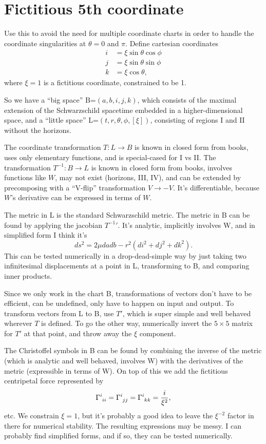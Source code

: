 \documentclass{article}
\begin{document}
\section{Fictitious 5th coordinate}
Use this to avoid the need for multiple coordinate charts in order to handle the coordinate singularities
at $\theta=0$ and $\pi$. Define cartesian coordinates
\begin{align*}
  i &= \xi \sin\theta \cos\phi \\
  j &= \xi \sin\theta \sin\phi \\
  k &= \xi \cos\theta ,
\end{align*}
where $\xi=1$ is a fictitious coordinate, constrained to be 1.

So we have a ``big space'' B=$(a,b,i,j,k)$, which consists of the maximal extension of the Schwarzschild
spacetime embedded in a higher-dimensional space, and a ``little space'' L=$(t,r,\theta,\phi,[\xi])$,
consisting of regions I and II without the horizons.

The coordinate transformation $T:L\to B$ is known in closed form from
books, uses only elementary functions, and is special-cased for I vs
II. The transformation $T^{-1}:B\to L$ is known in closed form from
books, involves functions like $W$, may not exist (horizons, III, IV),
and can be extended by precomposing with a ``V-flip'' transformation
$V\rightarrow -V$. It's differentiable, because $W$'s derivative can
be expressed in terms of $W$. 

The metric in L is the standard Schwarzschild metric.
The metric in B can be found by applying the jacobian ${T^{-1}}'$. It's analytic, implicitly involves W,
and in simplified form I think it's
\begin{equation*}
  ds^2 = 2\mu dadb -r^2(di^2+dj^2+dk^2).
\end{equation*}
This can be tested numerically in a drop-dead-simple way by just taking two
infinitesimal displacements at a point in L, transforming to B, and comparing inner products.

Since we only work in the chart B, transformations of vectors don't have to be
efficient, can be undefined, only have to happen on input and output. To transform vectors
from L to B, use $T'$, which is super simple and well behaved wherever $T$ is defined.
To go the other way, numerically invert the $5\times 5$ matrix for $T'$ at that point,
and throw away the $\xi$ component.

The Christoffel symbols in B can be found by combining the inverse of the metric
(which is analytic and well behaved, involves W) with the derivatives of the metric
(expressible in terms of W). On top of this we add the fictitious centripetal force
represented by
\begin{equation*}
  \Gamma\indices{^i_i_i} = \Gamma\indices{^i_j_j} = \Gamma\indices{^i_k_k} = \frac{i}{\xi^2},
\end{equation*}
etc. We constrain $\xi=1$, but it's probably a good idea to leave the $\xi^{-2}$ factor in
there for numerical stability. The resulting expressions may be messy. I can probably find simplified
forms, and if so, they can be tested numerically.
\end{document}
